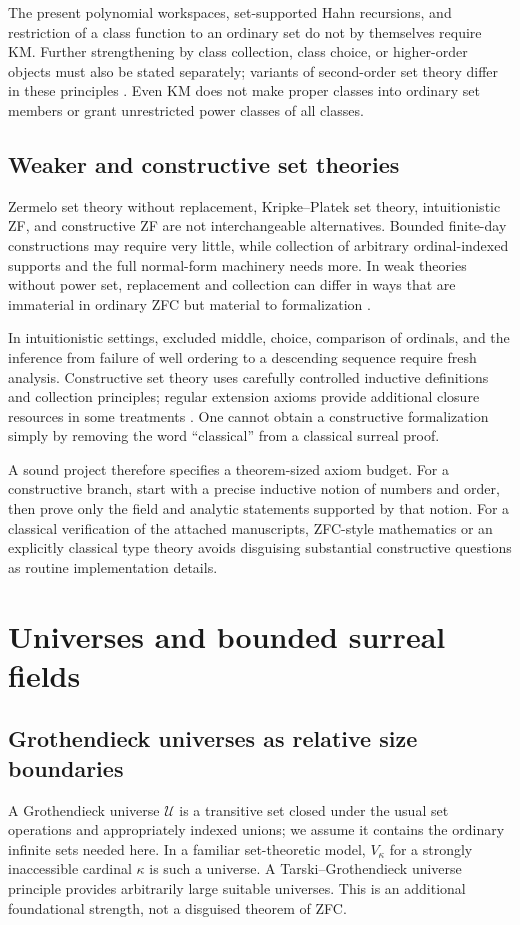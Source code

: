 \documentclass[11pt,letterpaper]{article}
\numberwithin{equation}{section}
\theoremstyle{definition}
\theoremstyle{remark}
\newcommand{\U}{\mathcal U}
\begin{document}
The present polynomial workspaces, set-supported Hahn recursions, and restriction of a class function to an ordinary set do not by themselves require KM. Further strengthening by class collection, class choice, or higher-order objects must also be stated separately; variants of second-order set theory differ in these principles \cite{Williams}. Even KM does not make proper classes into ordinary set members or grant unrestricted power classes of all classes.

\subsection{Weaker and constructive set theories}
Zermelo set theory without replacement, Kripke--Platek set theory, intuitionistic ZF, and constructive ZF are not interchangeable alternatives. Bounded finite-day constructions may require very little, while collection of arbitrary ordinal-indexed supports and the full normal-form machinery needs more. In weak theories without power set, replacement and collection can differ in ways that are immaterial in ordinary ZFC but material to formalization \cite{ZFCminus}.

In intuitionistic settings, excluded middle, choice, comparison of ordinals, and the inference from failure of well ordering to a descending sequence require fresh analysis. Constructive set theory uses carefully controlled inductive definitions and collection principles; regular extension axioms provide additional closure resources in some treatments \cite{Aczel,Rathjen}. One cannot obtain a constructive formalization simply by removing the word ``classical'' from a classical surreal proof.

A sound project therefore specifies a theorem-sized axiom budget. For a constructive branch, start with a precise inductive notion of numbers and order, then prove only the field and analytic statements supported by that notion. For a classical verification of the attached manuscripts, ZFC-style mathematics or an explicitly classical type theory avoids disguising substantial constructive questions as routine implementation details.

\section{Universes and bounded surreal fields}\label{sec:bounded}

\subsection{Grothendieck universes as relative size boundaries}
A Grothendieck universe $\U$ is a transitive set closed under the usual set operations and appropriately indexed unions; we assume it contains the ordinary infinite sets needed here. In a familiar set-theoretic model, $V_\kappa$ for a strongly inaccessible cardinal $\kappa$ is such a universe. A Tarski--Grothendieck universe principle provides arbitrarily large suitable universes. This is an additional foundational strength, not a disguised theorem of ZFC.
\end{document}
